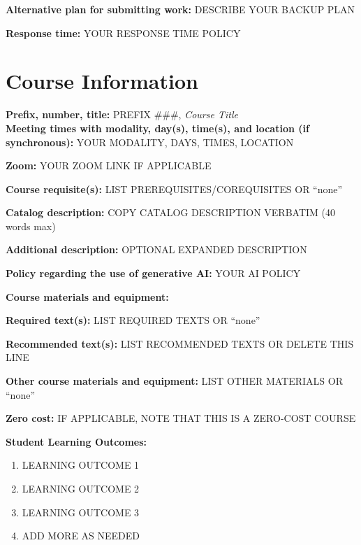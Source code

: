 \documentclass[12pt]{article}
\begin{document}
\vspace{0.5em}
\noindent \textbf{Alternative plan for submitting work:} DESCRIBE YOUR BACKUP PLAN

\vspace{0.5em}
\noindent \textbf{Response time:} YOUR RESPONSE TIME POLICY

\section*{Course Information}
\noindent \textbf{Prefix, number, title:} PREFIX \#\#\#, \textit{Course Title} \\
\noindent \textbf{Meeting times with modality, day(s), time(s), and location (if synchronous):} 
YOUR MODALITY, DAYS, TIMES, LOCATION

\vspace{0.5em}
\begin{flatlist}
\item \textbf{Zoom:} YOUR ZOOM LINK IF APPLICABLE
\item \textbf{Course requisite(s):} LIST PREREQUISITES/COREQUISITES OR ``none''
\item \textbf{Catalog description:} COPY CATALOG DESCRIPTION VERBATIM (40 words max)
\item \textbf{Additional description:} OPTIONAL EXPANDED DESCRIPTION
\item \textbf{Policy regarding the use of generative AI:} YOUR AI POLICY
\item \textbf{Course materials and equipment:} ~
\item \textbf{Required text(s):} LIST REQUIRED TEXTS OR ``none''
\item \textbf{Recommended text(s):} LIST RECOMMENDED TEXTS OR DELETE THIS LINE
\item \textbf{Other course materials and equipment:} LIST OTHER MATERIALS OR ``none''
\item \textbf{Zero cost:} IF APPLICABLE, NOTE THAT THIS IS A ZERO-COST COURSE
\end{flatlist}

\vspace{1em}
\noindent \textbf{Student Learning Outcomes:}
\begin{enumerate}
\item LEARNING OUTCOME 1
\item LEARNING OUTCOME 2
\item LEARNING OUTCOME 3
\item ADD MORE AS NEEDED
\end{enumerate}
\end{document}
